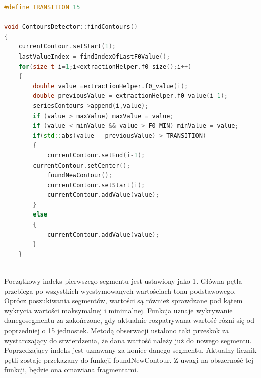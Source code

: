 \documentclass[a4paper,12 pt]{article}
\begin{document}
\newpage
\begin{lstlisting}[caption={Początkowa faza funkcji wykrywającej segmenty},label={lst:label},language=C++]
#define TRANSITION 15

void ContoursDetector::findContours()
{
    currentContour.setStart(1);
    lastValueIndex = findIndexOfLastF0Value();
    for(size_t i=1;i<extractionHelper.f0_size();i++)
    {
        double value =extractionHelper.f0_value(i);
        double previousValue = extractionHelper.f0_value(i-1); 
        seriesContours->append(i,value);
        if (value > maxValue) maxValue = value;
        if (value < minValue && value > F0_MIN) minValue = value;
        if(std::abs(value - previousValue) > TRANSITION)
        {
            currentContour.setEnd(i-1);
  	    currentContour.setCenter();    
            foundNewContour();
            currentContour.setStart(i);
            currentContour.addValue(value);
        }
        else
        {
            currentContour.addValue(value);
        }
    }
    
\end{lstlisting}
Początkowy indeks pierwszego segmentu jest ustawiony jako 1. Główna pętla przebiega po wszystkich wyestymowanych wartościach tonu podstawowego. Oprócz poszukiwania segmentów, wartości są również sprawdzane pod kątem wykrycia wartości maksymalnej i minimalnej. Funkcja uznaje wykrywanie danegosegmentu za zakończone, gdy aktualnie rozpatrywana wartość rózni się od poprzedniej o 15 jednostek. Metodą obserwacji ustalono taki przeskok za wystarczający do stwierdzenia, że dana wartość należy już do nowego segmentu. Poprzedzający indeks jest uznawany za koniec danego segmentu. Aktualny licznik pętli zostaje przekazany do funkcji foundNewContour. Z uwagi na obszerność tej funkcji, będzie ona omawiana fragmentami.
\end{document}
